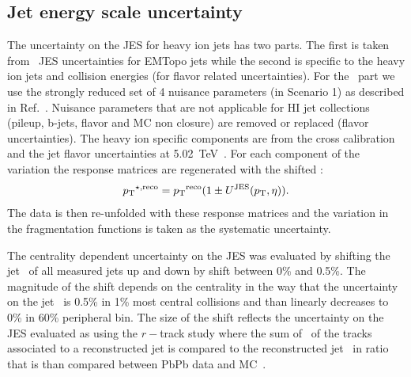 %

\subsection{Jet energy scale uncertainty}

The uncertainty on the JES for heavy ion jets has two parts.
 The first is taken from
 \pp\ JES uncertainties for EMTopo jets while the second is specific to the heavy ion jets
and collision energies (for flavor related uncertainties).
 For the \pp\ part we use the strongly reduced
set of 4 nuisance parameters (in Scenario 1) as described in Ref.~\cite{JESuncertaintytwiki}.
Nuisance parameters that are not applicable for HI jet collections (pileup, b-jets, flavor and MC non closure) are removed or replaced (flavor uncertainties).
The heavy ion specific components are from the cross calibration~\cite{cc2015} and the jet
flavor uncertainties at 5.02~TeV~\cite{2015392}.
 For each component of the variation
the response matrices are regenerated with the shifted \ptjet:
\begin{equation}
   \mbox{$p_{\mathrm{T}}$}^{\star,\mathrm{reco}} = \mbox{$p_{\mathrm{T}}$}^{\mathrm{reco}} (1\pm U^{\mathrm{JES}}(\mbox{$p_{\mathrm{T}}$} , \eta)).
\end{equation}
The data is then re-unfolded with these response matrices and the variation in the fragmentation 
functions is taken as the systematic uncertainty.

 The centrality dependent uncertainty on the JES was evaluated by shifting the jet \pt\ of all measured jets up and down by shift between 0\% and 0.5\%.
The magnitude of the shift depends on the centrality in the way that the uncertainty on the jet \pt\ is 0.5\% in 1\% most central collisions and than linearly decreases to 0\% in 60\% peripheral bin.
The size of the shift reflects the uncertainty on the JES evaluated as using the $r-$track study where the sum of \pT\ of the tracks associated to a reconstructed jet is compared to the reconstructed jet \pT\ in ratio that is than compared between PbPb data and MC~\cite{HIjesnote,Aad:2014bxa}.

